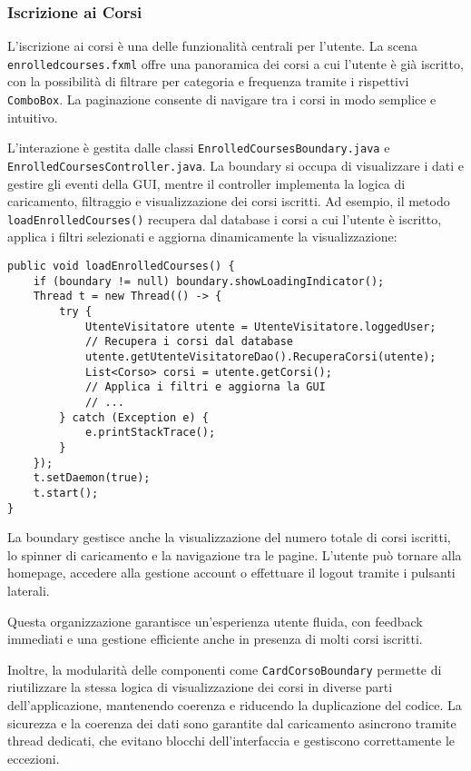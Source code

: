 \subsubsection{Iscrizione ai Corsi}

L'iscrizione ai corsi è una delle funzionalità centrali per l'utente. La scena \texttt{enrolledcourses.fxml} offre una panoramica dei corsi a cui l'utente è già iscritto, con la possibilità di filtrare per categoria e frequenza tramite i rispettivi \texttt{ComboBox}. La paginazione consente di navigare tra i corsi in modo semplice e intuitivo.

L'interazione è gestita dalle classi \texttt{EnrolledCoursesBoundary.java} e \texttt{EnrolledCoursesController.java}. La boundary si occupa di visualizzare i dati e gestire gli eventi della GUI, mentre il controller implementa la logica di caricamento, filtraggio e visualizzazione dei corsi iscritti. Ad esempio, il metodo \texttt{loadEnrolledCourses()} recupera dal database i corsi a cui l'utente è iscritto, applica i filtri selezionati e aggiorna dinamicamente la visualizzazione:
\begin{verbatim}
public void loadEnrolledCourses() {
    if (boundary != null) boundary.showLoadingIndicator();
    Thread t = new Thread(() -> {
        try {
            UtenteVisitatore utente = UtenteVisitatore.loggedUser;
            // Recupera i corsi dal database
            utente.getUtenteVisitatoreDao().RecuperaCorsi(utente);
            List<Corso> corsi = utente.getCorsi();
            // Applica i filtri e aggiorna la GUI
            // ...
        } catch (Exception e) {
            e.printStackTrace();
        }
    });
    t.setDaemon(true);
    t.start();
}
\end{verbatim}

La boundary gestisce anche la visualizzazione del numero totale di corsi iscritti, lo spinner di caricamento e la navigazione tra le pagine. L'utente può tornare alla homepage, accedere alla gestione account o effettuare il logout tramite i pulsanti laterali.

Questa organizzazione garantisce un'esperienza utente fluida, con feedback immediati e una gestione efficiente anche in presenza di molti corsi iscritti.

Inoltre, la modularità delle componenti come \texttt{CardCorsoBoundary} permette di riutilizzare la stessa logica di visualizzazione dei corsi in diverse parti dell'applicazione, mantenendo coerenza e riducendo la duplicazione del codice. La sicurezza e la coerenza dei dati sono garantite dal caricamento asincrono tramite thread dedicati, che evitano blocchi dell’interfaccia e gestiscono correttamente le eccezioni.

